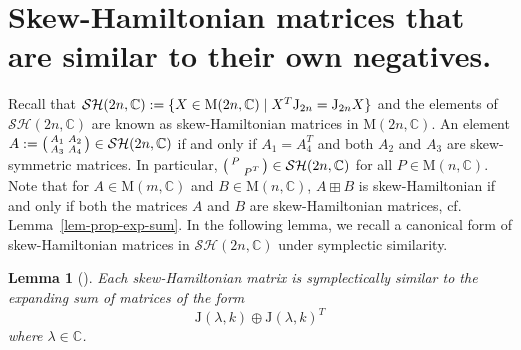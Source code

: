 \documentclass[11pt,reqno]{amsart}
\numberwithin{equation}{section}
\newtheorem{lemma}[theorem]{Lemma}
\theoremstyle{definition}
\def\C{\mathbb C}
\def\M{{\mathrm M}}
\def\C{\mathbb {C}}
\newcommand{\lemref}[1]{Lemma~\ref{#1}}
\begin{document}
\section{Skew-Hamiltonian matrices that are similar to their own negatives.} \label{sec-skew-class}
Recall that $\mathcal{SH}(2n,\C):= \{ X \in  \mathrm{M}(2n,\C) \mid X^T {\rm J}_{2n}  = {\rm J}_{2n}X  \}$ and the elements of $\mathcal{SH}(2n,\C)$ are known as skew-Hamiltonian matrices in  ${\M}(2n, \C) $.  An element 
$A:=\begin{psmallmatrix}
	A_{1}	& A_{2}\\
	A_{3} & A_{4} 
\end{psmallmatrix}\in \mathcal{SH}(2n,\C)$  if and only if $A_{1} = A_{4}^{T}$ and both $A_2$ and $A_3$ are skew-symmetric matrices. In particular, $\begin{psmallmatrix}
	P	& \\
	& P^{T}
\end{psmallmatrix} \in \mathcal{SH}(2n,\C)$ for all $P \in  \mathrm{M}(n,\C)$. Note that for  $A \in \mathrm{M}(m,\C)$ and  $B \in \mathrm{M}(n,\C)$,   $A \boxplus B$ is skew-Hamiltonian if and only if both the matrices  $A$ and $B$ are skew-Hamiltonian matrices, cf. \lemref{lem-prop-exp-sum}. In the following lemma, we recall a canonical form of skew-Hamiltonian matrices in $\mathcal{SH}(2n,\C)$ under symplectic similarity.
\begin{lemma}[{\cite[Lemma 6]{Cr}}]\label{lem-canonical-form-skew-Hamil-Cruz}
Each skew-Hamiltonian matrix is symplectically similar to the expanding sum of matrices of the form
	\begin{equation}
		\mathrm{J}(\lambda, k) \oplus  \mathrm{J}(\lambda, k)^{T}  
	\end{equation}
	where $\lambda \in \C$.
\end{lemma}
\end{document}

